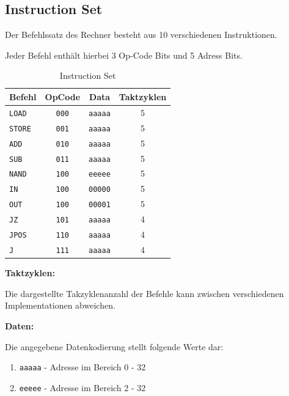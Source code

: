 \subsection{Instruction Set}

Der Befehlssatz des Rechner besteht aus 10 verschiedenen Instruktionen.

Jeder Befehl enthält hierbei 3 Op-Code Bits und 5 Adress Bits.

\vspace{1em}
\begin{table}[!h]
	\centering
	\begin{tabular}{|l|c|c|c|}
		\hline
		\textbf{Befehl} & \textbf{OpCode} & \textbf{Data} & \textbf{Taktzyklen}\\
		\hline
		\texttt{LOAD} & \texttt{000} & \texttt{aaaaa} & 5 \\
		\hline
		\texttt{STORE} & \texttt{001} & \texttt{aaaaa} & 5 \\
		\hline
		\texttt{ADD} & \texttt{010} & \texttt{aaaaa} & 5 \\
		\hline
		\texttt{SUB} & \texttt{011} & \texttt{aaaaa} & 5 \\
		\hline
		\texttt{NAND} & \texttt{100} & \texttt{eeeee} & 5 \\
		\hline
		\texttt{IN} & \texttt{100} & \texttt{00000} & 5 \\
		\hline
		\texttt{OUT} & \texttt{100} & \texttt{00001} & 5 \\
		\hline
		\texttt{JZ} & \texttt{101} & \texttt{aaaaa} & 4 \\
		\hline
		\texttt{JPOS} & \texttt{110} & \texttt{aaaaa} & 4 \\
		\hline
		\texttt{J} & \texttt{111} & \texttt{aaaaa} & 4 \\
		\hline
	\end{tabular}
	\caption{Instruction Set}
	\label{tab:instruction_set}
\end{table}

\textbf{Taktzyklen:}

Die dargestellte Takzyklenanzahl der Befehle kann zwischen verschiedenen Implementationen abweichen.

\textbf{Daten:}

Die angegebene Datenkodierung stellt folgende Werte dar:

\begin{enumerate}
\item \texttt{aaaaa} - Adresse im Bereich 0 - 32
\item \texttt{eeeee} - Adresse im Bereich 2 - 32
\end{enumerate}

